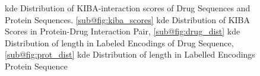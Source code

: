 \begin{figure}[htbp]
    \centering 
          


           \caption[KDE Distribution]{\acrfull{kde} Distribution of KIBA-interaction scores of Drug Sequences and Protein Sequences. \ref{sub@fig:kiba_scores} \acrshort{kde} Distribution of KIBA Scores in Protein-Drug Interaction Pair, \ref{sub@fig:drug_dist} \acrshort{kde} Distribution of length in Labeled Encodings of Drug Sequence, \ref{sub@fig:prot_dist} \acrshort{kde} Distribution of length in Labelled Encodings Protein Sequence }
           \label{fig:kiba_drug_protein}
\end{figure}
  
